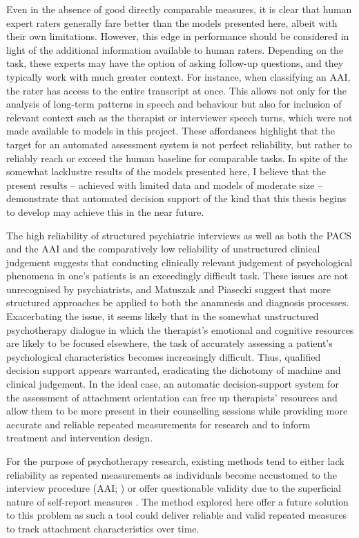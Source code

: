 \documentclass[12pt]{report}
\begin{document}
Even in the absence of good directly comparable measures, it is clear that human expert raters generally fare better than the models presented here, albeit with their own limitations.
However, this edge in performance should be considered in light of the additional information available to human raters.
Depending on the task, these experts may have the option of asking follow-up questions, and they typically work with much greater context.
For instance, when classifying an AAI, the rater has access to the entire transcript at once.
This allows not only for the analysis of long-term patterns in speech and behaviour but also for inclusion of relevant context such as the therapist or interviewer speech turns, which were not made available to models in this project.
These affordances highlight that the target for an automated assessment system is not perfect reliability, but rather to reliably reach or exceed the human baseline for comparable tasks.
In spite of the somewhat lacklustre results of the models presented here, I believe that the present results -- achieved with limited data and models of moderate size -- demonstrate that automated decision support of the kind that this thesis begins to develop may achieve this in the near future.

The high reliability of structured psychiatric interviews as well as both the PACS and the AAI and the comparatively low reliability of unstructured clinical judgement suggests that conducting clinically relevant judgement of psychological phenomena in one's patients is an exceedingly difficult task.
These issues are not unrecognised by psychiatrists, and Matuszak and Piasecki \citeyear{Matuszak2012} suggest that more structured approaches be applied to both the anamnesis and diagnosis processes.
Exacerbating the issue, it seems likely that in the somewhat unstructured psychotherapy dialogue in which the therapist's emotional and cognitive resources are likely to be focused elsewhere, the task of accurately assessing a patient's psychological characteristics becomes increasingly difficult.
Thus, qualified decision support appears warranted, eradicating the dichotomy of machine and clinical judgement.
In the ideal case, an automatic decision-support system for the assessment of attachment orientation can free up therapists' resources and allow them to be more present in their counselling sessions while providing more accurate and reliable repeated measurements for research and to inform treatment and intervention design.

For the purpose of psychotherapy research, existing methods tend to either lack reliability as repeated measurements as individuals become accustomed to the interview procedure (AAI; ) or offer questionable validity due to the superficial nature of self-report measures \cite{Talia2017}.
The method explored here offer a future solution to this problem as such a tool could deliver reliable and valid repeated measures to track attachment characteristics over time.
\end{document}
